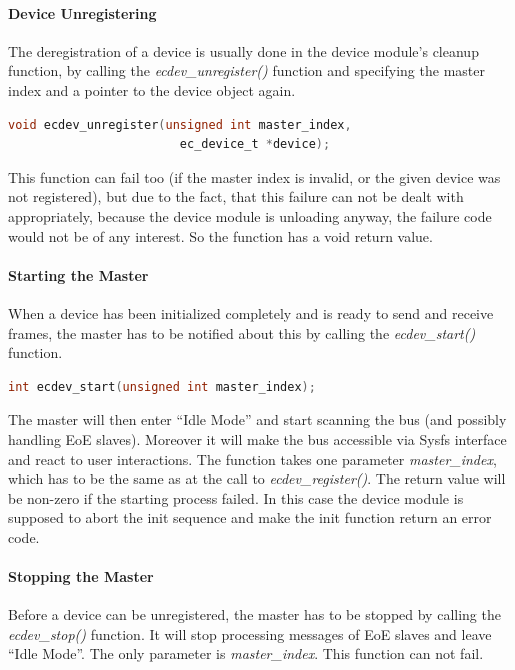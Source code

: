 \documentclass[a4paper,12pt,BCOR6mm,bibtotoc,idxtotoc]{scrbook}
\begin{document}
\paragraph{Device Unregistering}

The deregistration of a device is usually done in the device module's cleanup
function, by calling the \textit{ecdev\_unregister()} function and specifying
the master index and a pointer to the device object again.

\begin{lstlisting}[gobble=2,language=C]
  void ecdev_unregister(unsigned int master_index,
                        ec_device_t *device);
\end{lstlisting}

This function can fail too (if the master index is invalid, or the
given device was not registered), but due to the fact, that this
failure can not be dealt with appropriately, because the device module
is unloading anyway, the failure code would not be of any interest. So
the function has a void return value.

\paragraph{Starting the Master}

When a device has been initialized completely and is ready to send and
receive frames, the master has to be notified about this by calling
the \textit{ecdev\_start()} function.

\begin{lstlisting}[gobble=2,language=C]
  int ecdev_start(unsigned int master_index);
\end{lstlisting}

The master will then enter ``Idle Mode'' and start scanning the bus
(and possibly handling EoE slaves). Moreover it will make the bus
accessible via Sysfs interface and react to user interactions. The
function takes one parameter \textit{master\_index}, which has to be
the same as at the call to \textit{ecdev\_register()}. The return
value will be non-zero if the starting process failed. In this case
the device module is supposed to abort the init sequence and make the
init function return an error code.

\paragraph{Stopping the Master}

Before a device can be unregistered, the master has to be stopped by
calling the \textit{ecdev\_stop()} function. It will stop processing
messages of EoE slaves and leave ``Idle Mode''. The only parameter is
\textit{master\_index}. This function can not fail.
\end{document}
